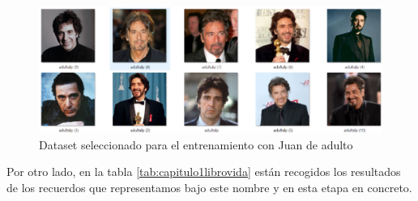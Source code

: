 \begin{figure}[!htb]
	\centering
	\includegraphics[width = 1
	\textwidth]{Imagenes/Vectorial/dataset_adultalp.png}
	\caption{Dataset seleccionado para el entrenamiento con Juan de adulto}
	\label{fig:datasetadultalp}
\end{figure}

Por otro lado, en la tabla \ref*{tab:capitulo1librovida} están recogidos los resultados de los recuerdos que representamos bajo este nombre y en esta etapa en concreto. 

